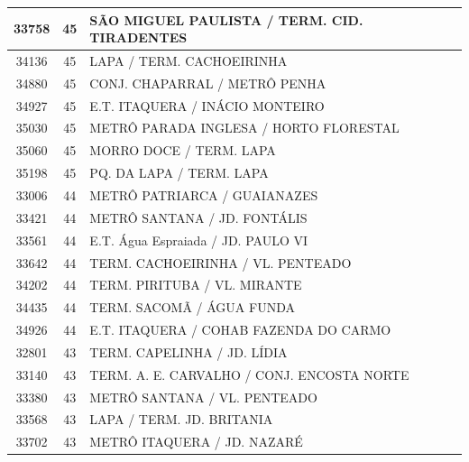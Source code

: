 \documentclass[
	12pt,				%
	oneside,			%
	a4paper,			%
	english,			%
	brazil				%
	]{abntex2ppgsi}
\begin{document}
\begin{apendicesenv}
\begin{longtable}{c|c|p{7cm}}
    33758 & 45    & SÃO MIGUEL PAULISTA / TERM. CID. TIRADENTES \\
\hline

    34136 & 45    & LAPA / TERM. CACHOEIRINHA \\
\hline

    34880 & 45    & CONJ. CHAPARRAL / METRÔ PENHA \\
\hline

    34927 & 45    & E.T. ITAQUERA / INÁCIO MONTEIRO \\
\hline

    35030 & 45    & METRÔ PARADA INGLESA / HORTO FLORESTAL \\
\hline

    35060 & 45    & MORRO DOCE / TERM. LAPA \\
\hline

    35198 & 45    & PQ. DA LAPA / TERM. LAPA \\
\hline

    33006 & 44    & METRÔ PATRIARCA / GUAIANAZES \\
\hline

    33421 & 44    & METRÔ SANTANA / JD. FONTÁLIS \\
\hline

    33561 & 44    & E.T. Água Espraiada / JD. PAULO VI \\
\hline

    33642 & 44    & TERM. CACHOEIRINHA / VL. PENTEADO \\
\hline

    34202 & 44    & TERM. PIRITUBA / VL. MIRANTE \\
\hline

    34435 & 44    & TERM. SACOMÃ / ÁGUA FUNDA \\
\hline

    34926 & 44    & E.T. ITAQUERA / COHAB FAZENDA DO CARMO \\
\hline

    32801 & 43    & TERM. CAPELINHA / JD. LÍDIA \\
\hline

    33140 & 43    & TERM. A. E. CARVALHO / CONJ. ENCOSTA NORTE \\
\hline

    33380 & 43    & METRÔ SANTANA / VL. PENTEADO \\
\hline

    33568 & 43    & LAPA / TERM. JD. BRITANIA \\
\hline

    33702 & 43    & METRÔ ITAQUERA / JD. NAZARÉ \\
\hline


\end{longtable}
\end{apendicesenv}
\end{document}
